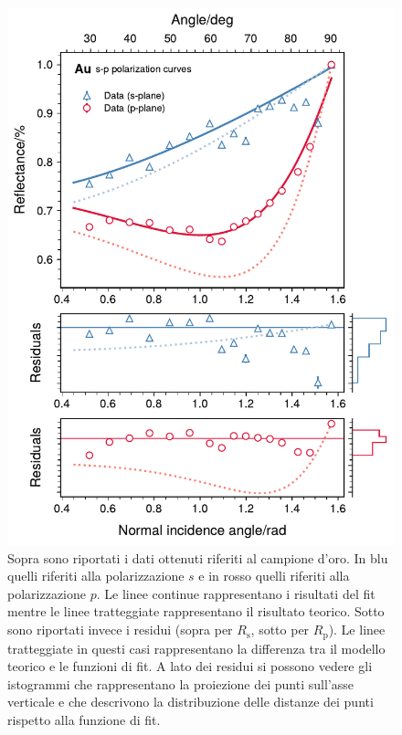 \documentclass[
    prb,altaffilletter,citeautoscript,
    amsmath,amssymb,
    showpacs,showkeys,floatfix,
    reprint
]{revtex4-1}
\begin{document}
\begin{figure}
    \centering
    \includegraphics[width=\linewidth]{figures/Au_Rs_Rp.pdf}
    \caption{Sopra sono riportati i dati ottenuti riferiti al campione d'oro. In blu quelli riferiti alla polarizzazione $s$ e in rosso quelli riferiti alla polarizzazione $p$. Le linee continue rappresentano i risultati del fit mentre le linee tratteggiate rappresentano il risultato teorico. Sotto sono riportati invece i residui (sopra per $R_\mathrm{s}$, sotto per $R_\mathrm{p}$). Le linee tratteggiate in questi casi rappresentano la differenza tra il modello teorico e le funzioni di fit. A lato dei residui si possono vedere gli istogrammi che rappresentano la proiezione dei punti sull'asse verticale e che descrivono la distribuzione delle distanze dei punti rispetto alla funzione di fit.}
    \label{fig:Au_Rs_Rp}
\end{figure}
\end{document}
